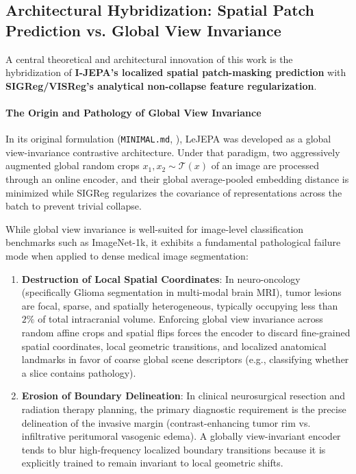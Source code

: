 \documentclass{article}
\begin{document}
\subsection{Architectural Hybridization: Spatial Patch Prediction vs. Global View Invariance}

A central theoretical and architectural innovation of this work is the hybridization of \textbf{I-JEPA's localized spatial patch-masking prediction} with \textbf{SIGReg/VISReg's analytical non-collapse feature regularization}.

\paragraph{The Origin and Pathology of Global View Invariance}
In its original formulation (\texttt{MINIMAL.md}, \citet{balestriero2025lejepa}), LeJEPA was developed as a global view-invariance contrastive architecture. Under that paradigm, two aggressively augmented global random crops $x_1, x_2 \sim \mathcal{T}(x)$ of an image are processed through an online encoder, and their global average-pooled embedding distance is minimized while SIGReg regularizes the covariance of representations across the batch to prevent trivial collapse.

While global view invariance is well-suited for image-level classification benchmarks such as ImageNet-1k, it exhibits a fundamental pathological failure mode when applied to dense medical image segmentation:
\begin{enumerate}
    \item \textbf{Destruction of Local Spatial Coordinates}: In neuro-oncology (specifically Glioma segmentation in multi-modal brain MRI), tumor lesions are focal, sparse, and spatially heterogeneous, typically occupying less than $2\%$ of total intracranial volume. Enforcing global view invariance across random affine crops and spatial flips forces the encoder to discard fine-grained spatial coordinates, local geometric transitions, and localized anatomical landmarks in favor of coarse global scene descriptors (e.g., classifying whether a slice contains pathology).
    \item \textbf{Erosion of Boundary Delineation}: In clinical neurosurgical resection and radiation therapy planning, the primary diagnostic requirement is the precise delineation of the invasive margin (contrast-enhancing tumor rim vs. infiltrative peritumoral vasogenic edema). A globally view-invariant encoder tends to blur high-frequency localized boundary transitions because it is explicitly trained to remain invariant to local geometric shifts.
\end{enumerate}
\end{document}

